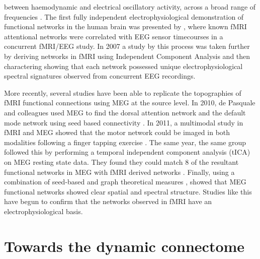 between haemodynamic and electrical oscillatory activity, across a broad range of frequencies \citep{Logothetis2001,Singh2002,Moradi2003,Brookes2005,Mukamel2005,Winterer2007,Muthukumaraswamy2008,Zumer2010,Stevenson2011,Stevenson2012}. The first fully independent electrophysiological demonstration of functional networks in the human brain was presented by \cite{Laufs2003}, where known fMRI attentional networks were correlated with EEG sensor timecourses in a concurrent fMRI/EEG study. In 2007 a study by \cite{Mantini2007} this process was taken further by deriving networks in fMRI using Independent Component Analysis and then charactering showing that each network possessed unique electrophysiological spectral signatures observed from concurrent EEG recordings. 

More recently, several studies have been able to replicate the topographies of fMRI functional connections using MEG at the source level. In 2010, de Pasquale and colleagues used MEG to find the dorsal attention network and the default mode network using seed based connectivity \citep{dePasquale2010}. In 2011, a multimodal study in fMRI and MEG showed that the motor network could be imaged in both modalities following a finger tapping exercise \citep{Brookes2011a}. The same year, the same group followed this by performing a temporal independent component analysis (tICA) on MEG resting state data. They found they could match 8 of the resultant functional networks in MEG with fMRI derived networks \citep{Brookes2011}. Finally, using a combination of seed-based and graph theoretical measures \cite{Hipp2012}, showed that MEG functional networks showed clear spatial and spectral structure. Studies like this have begun to confirm that the networks observed in fMRI have an electrophysiological basis.

\section{Towards the dynamic connectome}\label{sec_1_dyn}

